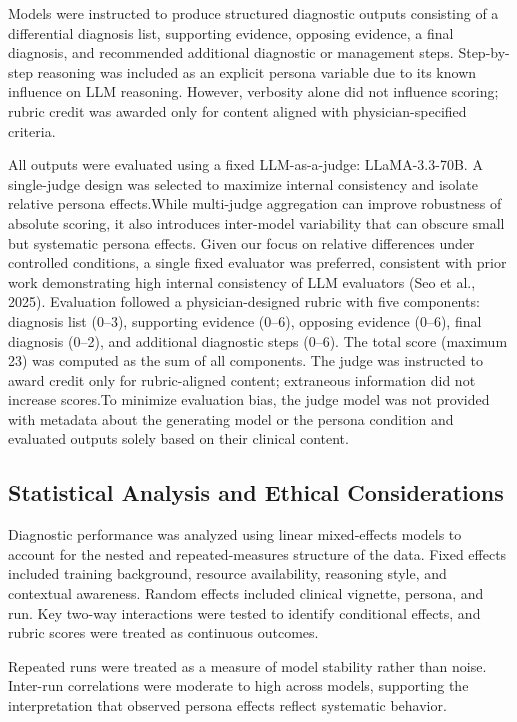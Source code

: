\documentclass[sigconf]{acmart}
\begin{document}
Models were instructed to produce structured diagnostic outputs consisting of a differential diagnosis list, supporting evidence, opposing evidence, a final diagnosis, and recommended additional diagnostic or management steps. Step-by-step reasoning was included as an explicit persona variable due to its known influence on LLM reasoning. However, verbosity alone did not influence scoring; rubric credit was awarded only for content aligned with physician-specified criteria.

All outputs were evaluated using a fixed LLM-as-a-judge: LLaMA-3.3-70B. A single-judge design was selected to maximize internal consistency and isolate relative persona effects.While multi-judge aggregation can improve robustness of absolute scoring, it also introduces inter-model variability that can obscure small but systematic persona effects. Given our focus on relative differences under controlled conditions, a single fixed evaluator was preferred, consistent with prior work demonstrating high internal consistency of LLM evaluators (Seo et al., 2025). Evaluation followed a physician-designed rubric with five components: diagnosis list (0--3), supporting evidence (0--6), opposing evidence (0--6), final diagnosis (0--2), and additional diagnostic steps (0--6). The total score (maximum 23) was computed as the sum of all components. The judge was instructed to award credit only for rubric-aligned content; extraneous information did not increase scores.To minimize evaluation bias, the judge model was not provided with metadata about the generating model or the persona condition and evaluated outputs solely based on their clinical content.
\raggedbottom
\subsection{Statistical Analysis and Ethical Considerations}

Diagnostic performance was analyzed using linear mixed-effects models to account for the nested and repeated-measures structure of the data. Fixed effects included training background, resource availability, reasoning style, and contextual awareness. Random effects included clinical vignette, persona, and run. Key two-way interactions were tested to identify conditional effects, and rubric scores were treated as continuous outcomes.

Repeated runs were treated as a measure of model stability rather than noise. Inter-run correlations were moderate to high across models, supporting the interpretation that observed persona effects reflect systematic behavior.
\end{document}
